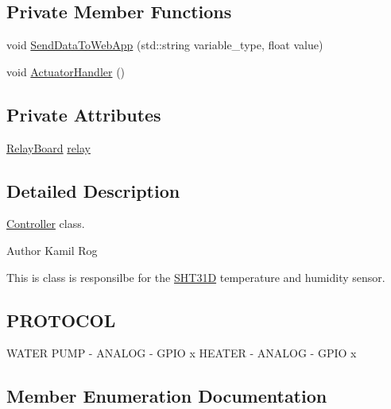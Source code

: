 \subsection*{Private Member Functions}
\begin{DoxyCompactItemize}
\item 
void \hyperlink{classController_a9d59ef3807f630a52c964a899a7235dd}{Send\+Data\+To\+Web\+App} (std\+::string variable\+\_\+type, float value)
\item 
void \hyperlink{classController_acd0145853d19eaf3ef9d15f6203ace69}{Actuator\+Handler} ()
\end{DoxyCompactItemize}
\subsection*{Private Attributes}
\begin{DoxyCompactItemize}
\item 
\hyperlink{classRelayBoard}{Relay\+Board} \hyperlink{classController_aa3f1d7aae706a5440adf520cbd7fb216}{relay}
\end{DoxyCompactItemize}


\subsection{Detailed Description}
\hyperlink{classController}{Controller} class. 

\begin{DoxyAuthor}{Author}
Kamil Rog
\end{DoxyAuthor}
This is class is responsilbe for the \hyperlink{classSHT31D}{S\+H\+T31D} temperature and humidity sensor.\hypertarget{classController_PROTOCOL}{}\subsection{P\+R\+O\+T\+O\+C\+OL}\label{classController_PROTOCOL}
W\+A\+T\+ER P\+U\+MP -\/ A\+N\+A\+L\+OG -\/ G\+P\+IO x H\+E\+A\+T\+ER -\/ A\+N\+A\+L\+OG -\/ G\+P\+IO x 

\subsection{Member Enumeration Documentation}
\mbox{\label{classController_ae0cc6feb81bc46e0859390fd1551ff43}} 

